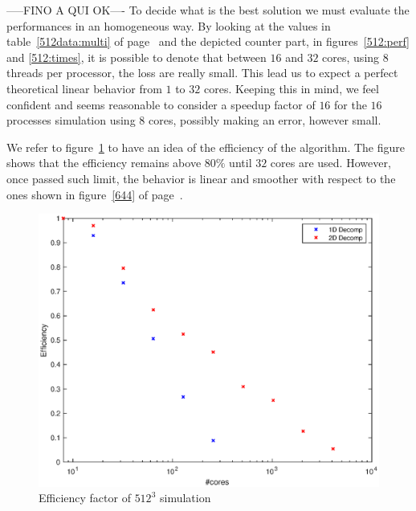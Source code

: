 -----FINO A QUI OK----
To decide what is the best solution we must evaluate the performances in an homogeneous way.
By looking at the values in table~\ref{512data:multi} of page~\pageref{512data:multi} and the depicted counter part, in figures~\ref{512:perf} and \ref{512:times}, it is possible to denote that between $16$ and $32$ cores, using 8 threads per processor, the loss are really small. This lead us to expect a perfect theoretical linear behavior from $1$ to $32$ cores. Keeping this in mind, we feel confident and seems reasonable to consider a speedup factor of $16$ for the $16$ processes simulation using 8 cores, possibly making an error, however small. \\
\par
We refer to figure~\ref{5123} to have an idea of the efficiency of the algorithm. The figure shows that the efficiency remains above $80\%$ until $32$ cores are used. However, once passed such limit, the behavior is linear and smoother with respect to the ones shown in figure~\ref{644} of page~\pageref{644}. 
\par

\begin{figure}
\begin{center}
\includegraphics[scale=0.6]{grafici/5123}
\caption{Efficiency factor of $512^3$ simulation}
\label{5123}
\end{center}
\end{figure}

